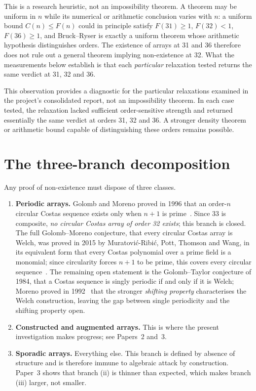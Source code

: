 \documentclass[11pt,a4paper,oneside]{report}
\theoremstyle{definition}
\begin{document}
This is a research heuristic, not an impossibility theorem. A theorem may be
uniform in $n$ while its numerical or arithmetic conclusion varies with $n$: a
uniform bound $C(n)\le F(n)$ could in principle satisfy $F(31)\ge1$, $F(32)<1$,
$F(36)\ge1$, and Bruck--Ryser is exactly a uniform theorem whose arithmetic
hypothesis distinguishes orders. The existence of arrays at 31 and 36 therefore
does not rule out a general theorem implying non-existence at 32. What the
measurements below establish is that each \emph{particular} relaxation tested
returns the same verdict at 31, 32 and 36.

This observation provides a diagnostic for the particular relaxations examined in the project's consolidated report, not an impossibility theorem. In each case
tested, the relaxation lacked sufficient order-sensitive strength and returned
essentially the same verdict at orders 31, 32 and 36. A stronger density theorem
or arithmetic bound capable of distinguishing these orders remains possible.

\section{The three-branch decomposition}

Any proof of non-existence must dispose of three classes.

\begin{enumerate}[label=(\roman*)]
\item \textbf{Periodic arrays.} Golomb and Moreno proved in 1996 that an order-$n$ circular Costas sequence exists only when $n+1$ is prime~\cite{p1-golombmoreno}. Since 33 is composite,
\emph{no circular Costas array of order 32 exists}; this branch is closed. The full Golomb--Moreno conjecture, that every circular Costas array is Welch, was proved in 2015 by
Muratovi\'c-Ribi\'c, Pott, Thomson and Wang, in its equivalent form that every Costas polynomial over a
prime field is a monomial; since circularity forces $n+1$ to be prime, this covers every circular sequence~\cite{p1-mpttw2015,p1-torresrubio2023}. The remaining open statement is the Golomb--Taylor conjecture of
1984, that a Costas sequence is singly periodic if and only if it is Welch;
Moreno proved in 1992~\cite{p1-moreno92} that the stronger \emph{shifting property} characterises
the Welch construction, leaving the gap between single periodicity and the
shifting property open.

\item \textbf{Constructed and augmented arrays.} This is where the present
investigation makes progress; see Papers~2 and~3.

\item \textbf{Sporadic arrays.} Everything else. This branch is defined by
absence of structure and is therefore immune to algebraic attack by
construction. Paper~3 shows that branch (ii) is thinner than
expected, which makes branch (iii) larger, not smaller.
\end{enumerate}
\end{document}

